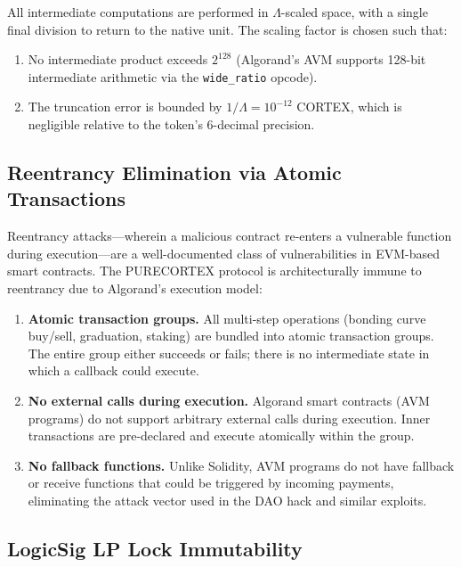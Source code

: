 All intermediate computations are performed in $\Lambda$-scaled space, with
a single final division to return to the native unit. The scaling factor is
chosen such that:
\begin{enumerate}
  \item No intermediate product exceeds $2^{128}$ (Algorand's AVM supports
    128-bit intermediate arithmetic via the \texttt{wide\_ratio} opcode).
  \item The truncation error is bounded by $1 / \Lambda = 10^{-12}$ CORTEX,
    which is negligible relative to the token's 6-decimal precision.
\end{enumerate}

\subsection{Reentrancy Elimination via Atomic Transactions}
\label{subsec:reentrancy}

Reentrancy attacks---wherein a malicious contract re-enters a vulnerable
function during execution---are a well-documented class of vulnerabilities in
EVM-based smart contracts. The PURECORTEX protocol is architecturally immune
to reentrancy due to Algorand's execution model:

\begin{enumerate}
  \item \textbf{Atomic transaction groups.} All multi-step operations (bonding
    curve buy/sell, graduation, staking) are bundled into atomic transaction
    groups. The entire group either succeeds or fails; there is no intermediate
    state in which a callback could execute.
  \item \textbf{No external calls during execution.} Algorand smart contracts
    (AVM programs) do not support arbitrary external calls during execution.
    Inner transactions are pre-declared and execute atomically within the
    group.
  \item \textbf{No fallback functions.} Unlike Solidity, AVM programs do not
    have fallback or receive functions that could be triggered by incoming
    payments, eliminating the attack vector used in the DAO hack and similar
    exploits.
\end{enumerate}

\subsection{LogicSig LP Lock Immutability}
\label{subsec:logicsig}

